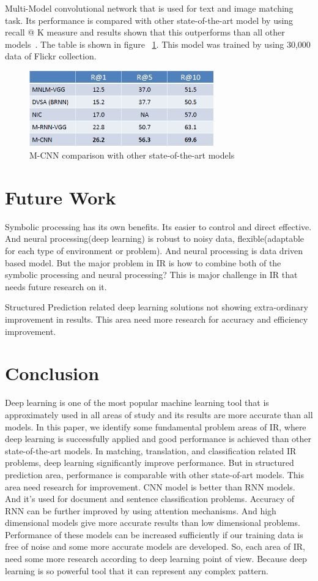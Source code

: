 \documentclass{doublecol-new}
\theoremstyle{TH}{
\newtheorem{lemma}{Lemma}
\newtheorem{theorem}[lemma]{Theorem}
\newtheorem{corrolary}[lemma]{Corrolary}
\newtheorem{conjecture}[lemma]{Conjecture}
\newtheorem{proposition}[lemma]{Proposition}
\newtheorem{claim}[lemma]{Claim}
\newtheorem{stheorem}[lemma]{Wrong Theorem}
\newtheorem{algorithm}{Algorithm}
}
\theoremstyle{THrm}{
\newtheorem{definition}{Definition}[section]
\newtheorem{question}{Question}[section]
\newtheorem{remark}{Remark}
\newtheorem{scheme}{Scheme}
}
\theoremstyle{THhit}{
\newtheorem{case}{Case}[section]
}
\begin{document}
Multi-Model convolutional network that is used for text and image matching task. Its performance is compared with other state-of-the-art model by using recall @ K measure and results shown that this outperforms than all other models~\cite{ma2015multimodal}. The table is shown in figure ~\ref{fig:M-CNN-result}. This model was trained by using 30,000 data of Flickr collection. 
\begin{figure}[h]
	\centerline{\includegraphics[width=8cm,keepaspectratio]{image/M-CNN-result.PNG}}
	\caption{M-CNN comparison with other state-of-the-art models}
	\label{fig:M-CNN-result}
\end{figure}
\section{Future Work}
Symbolic processing has its own benefits. Its easier to control and direct effective. And neural processing(deep learning) is robust to noisy data, flexible(adaptable for each type of environment or problem). And neural processing is data driven based model. But the major problem in IR is how to combine both of the symbolic processing and neural processing? This is major challenge in IR that needs future research on it\cite{li2016deep}. 

Structured Prediction related deep learning solutions not showing extra-ordinary improvement in results. This area need more research for accuracy and efficiency improvement.  
\section{Conclusion}
Deep learning is one of the most popular machine learning tool that is approximately used in all areas of study and its results are more accurate than all models. In this paper, we identify some fundamental problem areas of IR, where deep learning is successfully applied and good performance is achieved than other state-of-the-art models. In matching, translation, and classification related IR problems, deep learning significantly improve performance. But in structured prediction area, performance is comparable with other state-of-art models. This area need research for improvement. CNN model is better than RNN models. And it's used for document and sentence classification problems. Accuracy of RNN can be further improved by using attention mechanisms. And high dimensional models give more accurate results than low dimensional problems. Performance of these models can be increased sufficiently if our training data is free of noise and some more accurate models are developed. So, each area of IR, need some more research according to deep learning point of view. Because deep learning is so powerful tool that it can represent any complex pattern. 
\end{document}
